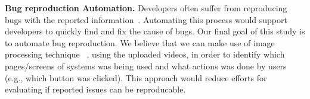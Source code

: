 \noindent
\textbf{Bug reproduction Automation.}
Developers often suffer from reproducing bugs with the reported information~\citep{DBLP:conf/sigsoft/ChaparroLZMPMBN17}\citep{DBLP:conf/icsm/0001KC20}\citep{zimmermann2010TSE}.
Automating this process would support developers to quickly find and fix the cause of bugs. 
Our final goal of this study is to automate bug reproduction. 
We believe that we can make use of image processing technique ~\citep{DBLP:conf/icse/Bernal-Cardenas20}\citep{he2019arxiv}\citep{DBLP:conf/nips/KrizhevskySH12}, using the uploaded videos, in order to identify which pages/screens of systems was being used and what actions was done by users (e.g., which button was clicked). 
This approach would reduce efforts for evaluating if reported issues can be reproducable. 





%  

